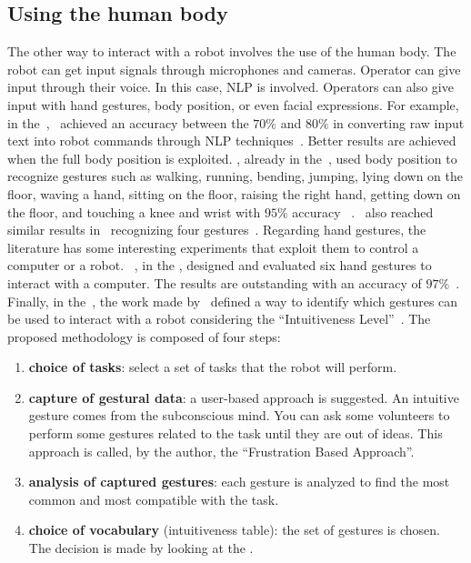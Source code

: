\documentclass[../thesis.tex]{subfiles}
\begin{document}
\subsection{Using the human body}
The other way to interact with a robot involves the use of the human body. The robot can get input signals through microphones and cameras. Operator can give input through their voice. In this case, \acrfull{NLP} is involved. Operators can also give input with hand gestures, body position, or even facial expressions. For example, in the~\citeyear{paper:commanding_a_robot_with_NLP},~\citeauthor{paper:commanding_a_robot_with_NLP} achieved an accuracy between the $70\%$ and $80\%$ in converting raw input text into robot commands through \acrshort{NLP} techniques~\cite{paper:commanding_a_robot_with_NLP}. Better results are achieved when the full body position is exploited. \citeauthor{paper:example_full_body_gesture1}, already in the~\citeyear{paper:example_full_body_gesture1}, used body position to recognize gestures such as walking, running, bending, jumping, lying down on the floor, waving a hand, sitting on the floor, raising the right hand, getting down on the floor, and touching a knee and wrist with $95\%$ accuracy ~\cite{paper:example_full_body_gesture1}.~\citeauthor{paper:example_full_body_gesture2} also reached similar results in~\citeyear{paper:example_full_body_gesture2} recognizing four gestures~\cite{paper:example_full_body_gesture2}. Regarding hand gestures, the literature has some interesting experiments that exploit them to control a computer or a robot. ~\citeauthor{paper:design_and_evaluate_hand_gesture}, in the \citeyear{paper:design_and_evaluate_hand_gesture}, designed and evaluated six hand gestures to interact with a computer. The results are outstanding with an accuracy of $97\%$~\cite{paper:design_and_evaluate_hand_gesture}. Finally, in the~\citeyear{paper:intuitiveness_level}, the work made by~\citeauthor{paper:intuitiveness_level} defined a way to identify which gestures can be used to interact with a robot considering the ``Intuitiveness Level''~\cite{paper:intuitiveness_level}. The proposed methodology is composed of four steps:
\begin{enumerate}
    \item \textbf{choice of tasks}: select a set of tasks that the robot will perform.
    \item \textbf{capture of gestural data}: a user-based approach is suggested. An intuitive gesture comes from the subconscious mind. You can ask some volunteers to perform some gestures related to the task until they are out of ideas. This approach is called, by the author, the ``Frustration Based Approach''.
    \item \textbf{analysis of captured gestures}: each gesture is analyzed to find the most common and most compatible with the task.
    \item \textbf{choice of vocabulary} (intuitiveness table): the set of gestures is chosen. The decision is made by looking at the .
\end{enumerate}
\end{document}
